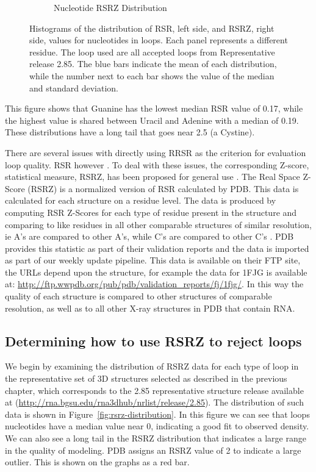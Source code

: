 \begin{figure}[ht]
\begin{subfigure}[b]{0.49\textwidth}
    \caption{Nucleotide RSRZ Distribution}
    \label{fig:rsrz-nt-distribution}
  \end{subfigure}
  \caption{Histograms of the distribution of RSR, left side, and RSRZ, right
  side, values for nucleotides in loops. Each panel represents a different
  residue. The loop used are all accepted loops from Representative release
  2.85. The blue bars indicate the mean of each distribution, while the number
  next to each bar shows the value of the median and standard deviation.}
  \label{fig:nt-quality-distribution}
\end{figure}

This figure shows that Guanine has the lowest median RSR value of 0.17, while
the highest value is shared between Uracil and Adenine with a median of 0.19.
These distributions have a long tail that goes near 2.5 (a Cystine).

There are several issues with directly using RRSR as the criterion for
evaluation loop quality. RSR however \cite{Tickle2012}. To deal with these
issues, the corresponding Z-score, statistical measure, RSRZ, has been proposed
for general use \cite{Gore2012}. The Real Space Z-Score (RSRZ) is a normalized
version of RSR calculated by PDB. This data is calculated for each structure on
a residue level. The data is produced by computing RSR Z-Scores for each type of
residue present in the structure and comparing to like residues in all other
comparable structures of similar resolution, ie A's are compared to other A's,
while C's are compared to other C's \cite{Gore2012, Kleywegt2004a}. PDB provides
this statistic as part of their validation reports and the data is imported as
part of our weekly update pipeline. This data is available on their FTP site,
the URLs depend upon the structure, for example the data for 1FJG is available
at: \url{http://ftp.wwpdb.org/pub/pdb/validation\_reports/fj/1fjg/}. In this way
the quality of each structure is compared to other structures of comparable
resolution, as well as to all other X-ray structures in PDB that contain RNA.

\subsection{Determining how to use RSRZ to reject loops}

We begin by examining the distribution of RSRZ data for each type of loop in the
representative set of 3D structures selected as described in the previous
chapter, which corresponds to the 2.85 representative structure release
available at (\url{http://rna.bgsu.edu/rna3dhub/nrlist/release/2.85}). The
distribution of such data is shown in Figure~\ref{fig:rsrz-distribution}. In
this figure we can see that loops nucleotides have a median value near 0,
indicating a good fit to observed density. We can also see a long tail in the
RSRZ distribution that indicates a large range in the quality of modeling. PDB
assigns an RSRZ value of 2 to indicate a large outlier. This is shown on the
graphs as a red bar.

